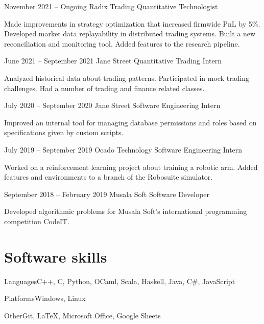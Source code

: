 \documentclass{tccv}
\begin{document}
\begin{eventlist}

\item{November 2021 -- Ongoing}
     {Radix Trading}
     {Quantitative Technologist}

Made improvements in strategy optimization that increased firmwide PnL by 5\%.
Developed market data replayability in distributed trading systems.
Built a new reconciliation and monitoring tool.
Added features to the research pipeline.

\item{June 2021 -- September 2021}
     {Jane Street}
     {Quantitative Trading Intern}

Analyzed historical data about trading patterns.
Participated in mock trading challenges.
Had a number of trading and finance related classes. 

\item{July 2020 -- September 2020}
     {Jane Street}
     {Software Engineering Intern}

Improved an internal tool for managing database permissions and roles
based on specifications given by custom scripts.

\item{July 2019 -- September 2019}
     {Ocado Technology}
     {Software Engineering Intern}

Worked on a reinforcement learning project about training a robotic arm.
Added features and environments to a branch of the Robosuite simulator.

\item{September 2018 -- February 2019}
     {Musala Soft}
     {Software Developer}

Developed algorithmic problems for Musala Soft's international programming competition CodeIT.

\end{eventlist}

\section{Software skills}

\begin{factlist}

\item{Languages}{C++, C, Python, OCaml, Scala, Haskell, Java, C\#, JavaScript}
\item{Platforms}{Windows, Linux}
\item{Other}{Git, \LaTeX, Microsoft Office, Google Sheets}

\end{factlist}
\end{document}

